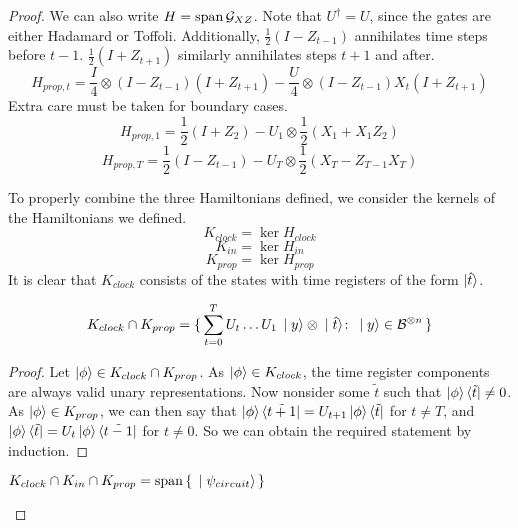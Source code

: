 \begin{proof}
We can also write $H=\operatorname*{\operatorname{span}}\mathcal{G}_{XZ}$. Note that $U^\dagger=U$, since the gates are either Hadamard or Toffoli. Additionally, $\frac{1}{2}(I-Z_{t-1})$ annihilates time steps before $t-1$. $\frac{1}{2}(I+Z_{t+1})$ similarly annihilates steps $t+1$ and after.
$$H_{prop,t}=\frac{I}{4}\otimes(I-Z_{t-1})(I+Z_{t+1})-\frac{U}{4}\otimes(I-Z_{t-1})X_t(I+Z_{t+1})$$
Extra care must be taken for boundary cases.
$$H_{prop,1}=\frac{1}{2}(I+Z_2)-U_1\otimes\frac{1}{2}(X_1+X_1Z_2)$$
$$H_{prop,T}=\frac{1}{2}(I-Z_{t-1})-U_T\otimes\frac{1}{2}(X_T-Z_{T-1}X_T)$$

To properly combine the three Hamiltonians defined, we consider the kernels of the Hamiltonians we defined.
$$K_{clock}=\ker H_{clock}$$
$$K_{in}=\ker H_{in}$$
$$K_{prop}=\ker H_{prop}$$
It is clear that $K_{clock}$ consists of the states with time registers of the form $\ket{\hat{t}}$.

\begin{lemma}
	$$K_{clock}\cap K_{prop}=\set{\sum_{t=0}^TU_t\ldots U_1\ket{y}\otimes\ket{\hat{t}}\colon \ket{y}\in\mathcal{B}^{\otimes n}}$$
\end{lemma}

\begin{proof}
	Let $\ket\phi\in K_{clock}\cap K_{prop}$. As $\ket\phi\in K_{clock}$, the time register components are always valid unary representations. Now nonsider some $\tilde{t}$ such that $\ket\phi\bra{\tilde{t}}\ne0$. As $\ket\phi\in K_{prop}$, we can then say that $\ket\phi\bra{\tilde{t+1}}=U_{t+1}\ket\phi\bra{\tilde{t}}$ for $t\ne T$, and $\ket\phi\bra{\tilde{t}}=U_t\ket\phi\bra{\tilde{t-1}}$ for $t\ne0$. So we can obtain the required statement by induction.
\end{proof}

\begin{corollary}
	$K_{clock}\cap K_{in}\cap K_{prop}=\operatorname*{\operatorname{span}}\set{\ket{\psi_{circuit}}}$
\end{corollary}


\end{proof}
